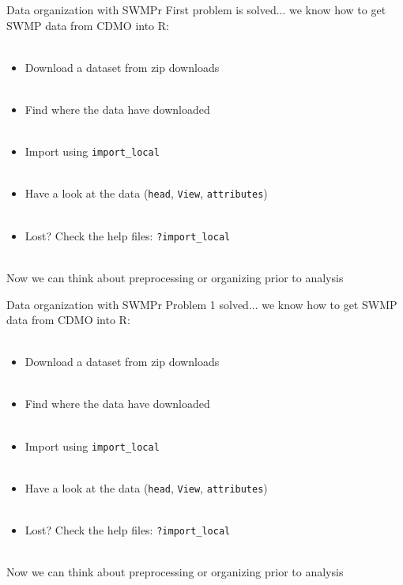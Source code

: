 \documentclass[xcolor=dvipsnames]{beamer}\usepackage[]{graphicx}\usepackage[]{color}
\begin{document}
\begin{frame}{Data organization with SWMPr}
First problem is solved... we know how to get SWMP data from CDMO into R: \\~\\
\begin{itemize}
\item Download a dataset from zip downloads \\~\\
\item Find where the data have downloaded \\~\\
\item Import using \texttt{import_local} \\~\\
\item Have a look at the data (\texttt{head}, \texttt{View}, \texttt{attributes}) \\~\\
\item Lost? Check the help files: \texttt{?import\_local}\\~\\
\end{itemize}
Now we can think about preprocessing or organizing prior to analysis
\end{frame}

\begin{frame}{Data organization with SWMPr}
Problem 1 solved... we know how to get SWMP data from CDMO into R: \\~\\
\begin{itemize}
\item Download a dataset from zip downloads \\~\\
\item Find where the data have downloaded \\~\\
\item Import using \texttt{import_local} \\~\\
\item Have a look at the data (\texttt{head}, \texttt{View}, \texttt{attributes}) \\~\\
\item Lost? Check the help files: \texttt{?import\_local}\\~\\
\end{itemize}
Now we can think about preprocessing or organizing prior to analysis
\end{frame}
\end{document}
